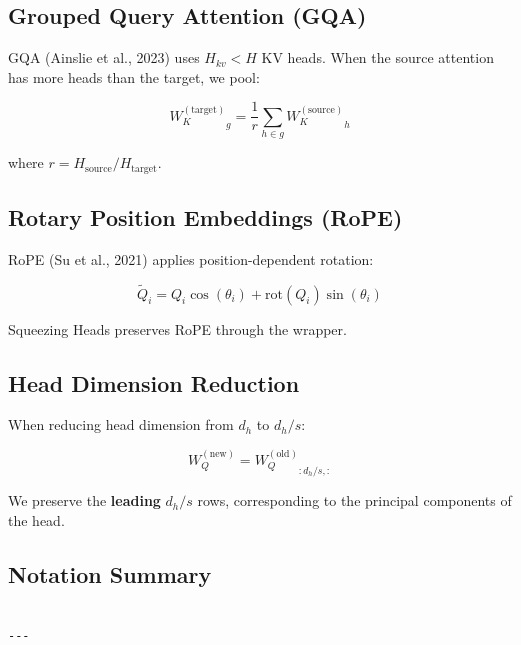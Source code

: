 \subsection{Grouped Query Attention (GQA)}

GQA (Ainslie et al., 2023) uses $H_{kv} < H$ KV heads. When the source 
attention has more heads than the target, we pool:

\[
{W_K^{(\text{target})}}_g = \frac{1}{r} \sum_{h \in g} {W_K^{(\text{source})}}_h
\]

where $r = H_\text{source} / H_\text{target}$.

\subsection{Rotary Position Embeddings (RoPE)}

RoPE (Su et al., 2021) applies position-dependent rotation:

\[
\tilde{Q}_i = Q_i \cos(\theta_i) + \text{rot}(Q_i) \sin(\theta_i)
\]

Squeezing Heads preserves RoPE through the wrapper.

\subsection{Head Dimension Reduction}

When reducing head dimension from $d_h$ to $d_h / s$:

\[
W_Q^{(\text{new})} = {W_Q^{(\text{old})}}_{:d_h/s, :}
\]

We preserve the \textbf{leading} $d_h / s$ rows, corresponding to the principal 
components of the head.

\subsection{Notation Summary}

\begin{lstlisting}

---
\end{lstlisting}